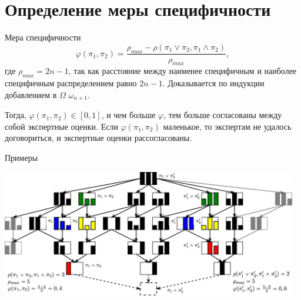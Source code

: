 \documentclass[russian, unicode, mathserif, aspectratio=169]{beamer}
\begin{document}
\section{Определение меры специфичности}
{
\frame{\transdissolve\sectionpage}
}

\begin{frame}{Мера специфичности}
\begin{equation}
    \varphi(\pi_1, \pi_2) = \frac{\rho_{max} - \rho(\pi_1 \lor \pi_2, \pi_1 \land \pi_2)}{\rho_{max}},
\end{equation}
где $\rho_{max} = 2n - 1$, так как расстояние между наименее специфичным и наиболее специфичным распределением равно $2n - 1$. Доказывается по индукции добавлением в $\Omega$ $\omega_{n+1}$.

Тогда, $\varphi(\pi_1, \pi_2) \in [0, 1]$, и чем больше $\varphi$, тем больше согласованы между собой экспертные оценки. Если $\varphi(\pi_1, \pi_2)$ маленькое, то экспертам не удалось договориться, и экспертные оценки рассогласованы.
\end{frame}

\begin{frame}{Примеры}
    \begin{center}
	\includegraphics[width=0.97\textwidth]{pictures/three-point-omega-spec-examples.png}
	\end{center}
\end{frame}
\end{document}

